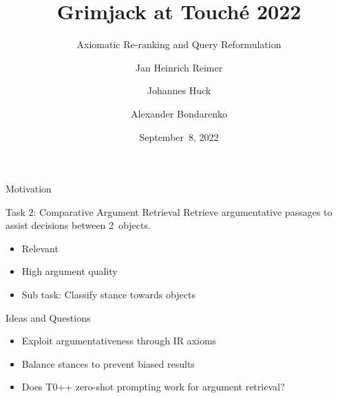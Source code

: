 \documentclass[english]{mlutalk}
\title{Grimjack at Touché 2022}
\subtitle{Axiomatic Re-ranking and Query Reformulation}
\author{Jan Heinrich Reimer \and Johannes Huck \and Alexander Bondarenko}
\institute{Martin Luther University Halle-Wittenberg\\\url{https://webis.de}}
\date{September~8, 2022}
\begin{document}
\titleframe

\begin{frame}{Motivation}  
  \begin{block}{Task 2: Comparative Argument Retrieval}
    Retrieve argumentative passages to assist decisions between 2~objects.
    \begin{itemize}
      \item Relevant
      \item High argument quality
      \item Sub task: Classify stance towards objects
    \end{itemize}
  \end{block}
  \vspace{3ex}
  \begin{block}{Ideas and Questions}
    \begin{itemize}
      \item Exploit argumentativeness through IR axioms~\cite{BondarenkoFKHVS2019,BondarenkoFRSVH2022}
      \item Balance stances to prevent biased results~\cite{CherumanalSSC2021}
      \item Does T0++ zero-shot prompting work for argument retrieval?~\cite{SanhWRBSACSLRDBXTSSKCNDCJWMSYPBWNRSSFFTBGBWR2021}
    \end{itemize}
  \end{block}
\end{frame}
\end{document}

